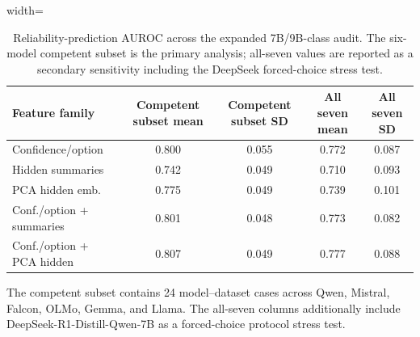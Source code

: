 \begin{table}[t]
\centering
\small
\caption{Reliability-prediction AUROC across the expanded 7B/9B-class audit. The six-model competent subset is the primary analysis; all-seven values are reported as a secondary sensitivity including the DeepSeek forced-choice stress test.}
\label{tab:overall-probes}
\begin{threeparttable}
\begin{adjustbox}{width=\textwidth}
\begin{tabular}{lcccc}
\toprule
Feature family & Competent subset mean & Competent subset SD & All seven mean & All seven SD \\
\midrule
Confidence/option & 0.800 & 0.055 & 0.772 & 0.087 \\
Hidden summaries & 0.742 & 0.049 & 0.710 & 0.093 \\
PCA hidden emb. & 0.775 & 0.049 & 0.739 & 0.101 \\
Conf./option + summaries & 0.801 & 0.048 & 0.773 & 0.082 \\
Conf./option + PCA hidden & 0.807 & 0.049 & 0.777 & 0.088 \\
\bottomrule
\end{tabular}
\end{adjustbox}
\begin{tablenotes}[flushleft]\footnotesize\item The competent subset contains 24 model--dataset cases across Qwen, Mistral, Falcon, OLMo, Gemma, and Llama. The all-seven columns additionally include DeepSeek-R1-Distill-Qwen-7B as a forced-choice protocol stress test.\end{tablenotes}
\end{threeparttable}
\end{table}
